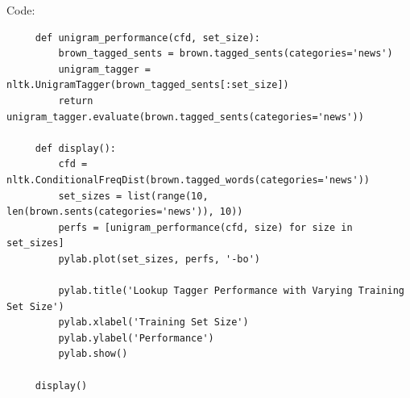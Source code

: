 \documentclass[12pt]{article}
\begin{document}
	 Code:
	 \begin{lstlisting}
	 def unigram_performance(cfd, set_size):
		 brown_tagged_sents = brown.tagged_sents(categories='news')
		 unigram_tagger = nltk.UnigramTagger(brown_tagged_sents[:set_size])
		 return unigram_tagger.evaluate(brown.tagged_sents(categories='news'))
	 
	 def display():
		 cfd = nltk.ConditionalFreqDist(brown.tagged_words(categories='news'))
		 set_sizes = list(range(10, len(brown.sents(categories='news')), 10))
		 perfs = [unigram_performance(cfd, size) for size in set_sizes]
		 pylab.plot(set_sizes, perfs, '-bo')
		 
		 pylab.title('Lookup Tagger Performance with Varying Training Set Size')
		 pylab.xlabel('Training Set Size')
		 pylab.ylabel('Performance')
		 pylab.show()
	 
	 display()
	 \end{lstlisting}
	
\end{document}
